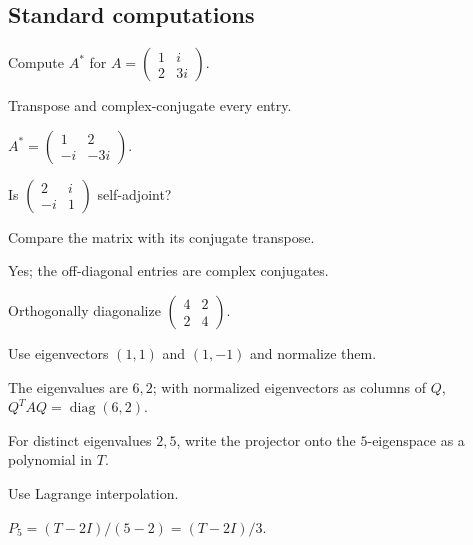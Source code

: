 \subsection*{Standard computations}

\begin{exercise}[Adjoint]\label{exr:i16-expand-01}
Compute \(A^*\) for \(A=\begin{pmatrix}1&i\\2&3i\end{pmatrix}\).
\end{exercise}
\begin{hint}
Transpose and complex-conjugate every entry.
\end{hint}
\begin{solution}
\(A^*=\begin{pmatrix}1&2\\-i&-3i\end{pmatrix}\).
\end{solution}

\begin{exercise}\label{exr:i16-expand-02}
Is \(\begin{pmatrix}2&i\\-i&1\end{pmatrix}\) self-adjoint?
\end{exercise}
\begin{hint}
Compare the matrix with its conjugate transpose.
\end{hint}
\begin{solution}
Yes; the off-diagonal entries are complex conjugates.
\end{solution}

\begin{exercise}\label{exr:i16-expand-03}
Orthogonally diagonalize \(\begin{pmatrix}4&2\\2&4\end{pmatrix}\).
\end{exercise}
\begin{hint}
Use eigenvectors \((1,1)\) and \((1,-1)\) and normalize them.
\end{hint}
\begin{solution}
The eigenvalues are \(6,2\); with normalized eigenvectors as columns of \(Q\), \(Q^TAQ=\operatorname{diag}(6,2)\).
\end{solution}

\begin{exercise}\label{exr:i16-expand-04}
For distinct eigenvalues \(2,5\), write the projector onto the \(5\)-eigenspace as a polynomial in \(T\).
\end{exercise}
\begin{hint}
Use Lagrange interpolation.
\end{hint}
\begin{solution}
\(P_5=(T-2I)/(5-2)=(T-2I)/3\).
\end{solution}

